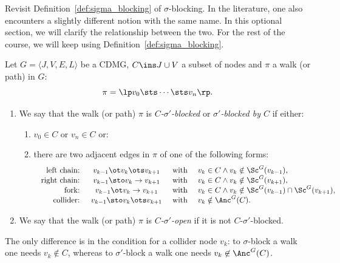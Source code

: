 Revisit Definition~\ref{def:sigma_blocking} of $\sigma$-blocking. In the literature, one also encounters
a slightly different notion with the same name. In this optional section, we will clarify the relationship
between the two. For the rest of the course, we will keep using Definition~\ref{def:sigma_blocking}.
\begin{Def}\label{def:sigma_blocking_2}
  Let $G=\langle J,V,E,L \rangle$ be a CDMG, $C \ins J \cup V$ a subset of nodes and $\pi$ a walk (or path) in $G$:
  \[ \pi =\lp  v_0 \sts \cdots \sts v_n \rp.  \]
\begin{enumerate}
  \item
    We say that the walk (or path) $\pi$ is \emph{$C$-$\sigma'$-blocked} or \emph{$\sigma'$-blocked by $C$} if either:
      \begin{enumerate}[label=\roman*.)]
          \item $v_0 \in C$ or $v_n \in C$ or:
          \item there are two adjacent edges in $\pi$ of one of the following forms:
              \[\begin{array}{rccl}
  \text{ left chain: } & v_{k-1} \ot v_k \ots v_{k+1} & \text{ with } & v_k \in C \land v_k \notin \Sc^G(v_{k-1}),\\
  \text{ right chain: } & v_{k-1} \sto v_k \to v_{k+1} & \text{ with } & v_k \in C \land v_k \notin \Sc^G(v_{k+1}),\\
  \text{ fork: } & v_{k-1} \ot v_k \to v_{k+1} & \text{ with } & v_k \in C \land v_k \notin \Sc^G(v_{k-1}) \cap \Sc^G(v_{k+1}),\\
                \text{ collider: } & v_{k-1} \sto v_k \ots v_{k+1} & \text{ with } & v_k \notin \Anc^G(C).
              \end{array}\]
      \end{enumerate}
  \item We say that the walk (or path) $\pi$ is \emph{$C$-$\sigma'$-open} if it is not $C$-$\sigma'$-blocked. 
\end{enumerate}
\end{Def}
The only difference is in the condition for a collider node $v_k$: to $\sigma$-block
a walk one needs $v_k \not\in C$, whereas to $\sigma'$-block a walk one needs $v_k \not\in \Anc^G(C)$.

